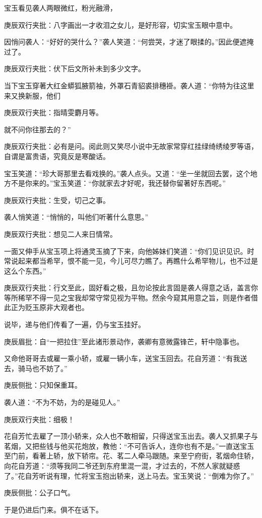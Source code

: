 \begin{parag}


    宝玉看见袭人两眼微红，粉光融滑，\begin{note}庚辰双行夹批：八字画出一才收泪之女儿，是好形容，切实宝玉眼中意中。\end{note}因悄问袭人：“好好的哭什么？”袭人笑道：“何尝哭，才迷了眼揉的。”因此便遮掩过了。\begin{note}庚辰双行夹批：伏下后文所补未到多少文字。\end{note}当下宝玉穿著大红金蟒狐腋箭袖，外罩石青貂裘排穗褂。袭人道：“你特为往这里来又换新服，他们\begin{note}庚辰双行夹批：指晴雯麝月等。\end{note}就不问你往那去的？”\begin{note}庚辰双行夹批：必有是问。阅此则又笑尽小说中无故家常穿红挂绿绮绣绫罗等语，自谓是富贵语，究竟反是寒酸话。\end{note}宝玉笑道：“珍大哥那里去看戏换的。”袭人点头。又道：“坐一坐就回去罢，这个地方不是你来的。”宝玉笑道：“你就家去才好呢，我还替你留著好东西呢。”\begin{note}庚辰双行夹批：生受，切己之事。\end{note}袭人悄笑道：“悄悄的，叫他们听著什么意思。”\begin{note}庚辰双行夹批：想见二人来日情常。\end{note}一面又伸手从宝玉项上将通灵玉摘了下来，向他姊妹们笑道：“你们见识见识。时常说起来都当希罕，恨不能一见，今儿可尽力瞧了。再瞧什么希罕物儿，也不过是这么个东西。”\begin{note}庚辰双行夹批：行文至此，固好看之极，且勿论按此言固是袭人得意之话，盖言你等所稀罕不得一见之宝我却常守常见视为平物。然余今窥其用意之旨，则是作者借此正为贬玉原非大观者也。\end{note}说毕，递与他们传看了一遍，仍与宝玉挂好。\begin{note}庚辰眉批：自“一把拉住”至此诸形景动作，袭卿有意微露锋芒，轩中隐事也。\end{note}又命他哥哥去或雇一乘小轿，或雇一辆小车，送宝玉回去。花自芳道：“有我送去，骑马也不妨了。”\begin{note}庚辰侧批：只知保重耳。\end{note}袭人道：“不为不妨，为的是碰见人。”\begin{note}庚辰双行夹批：细极！\end{note}
\end{parag}


\begin{parag}


    花自芳忙去雇了一顶小轿来，众人也不敢相留，只得送宝玉出去。袭人又抓果子与茗烟，又把些钱与他买花炮放，教他：“不可告诉人，连你也有不是。”一直送宝玉至门前，看著上轿，放下轿帘。花、茗二人牵马跟随。来至宁府街，茗烟命住轿，向花自芳道：“须等我同二爷还到东府里混一混，才过去的，不然人家就疑惑了。”花自芳听说有理，忙将宝玉抱出轿来，送上马去。宝玉笑说：“倒难为你了。”\begin{note}庚辰侧批：公子口气。\end{note}于是仍进后门来。俱不在话下。
\end{parag}


